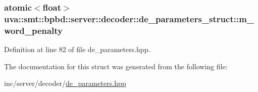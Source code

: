 \subsubsection[{m\+\_\+word\+\_\+penalty}]{\setlength{\rightskip}{0pt plus 5cm}atomic$<$float$>$ uva\+::smt\+::bpbd\+::server\+::decoder\+::de\+\_\+parameters\+\_\+struct\+::m\+\_\+word\+\_\+penalty}\label{structuva_1_1smt_1_1bpbd_1_1server_1_1decoder_1_1de__parameters__struct_a64e98803ca81cbf1ce6ea815f7efa6a0}


Definition at line 82 of file de\+\_\+parameters.\+hpp.



The documentation for this struct was generated from the following file\+:\begin{DoxyCompactItemize}
\item 
inc/server/decoder/\hyperlink{de__parameters_8hpp}{de\+\_\+parameters.\+hpp}\end{DoxyCompactItemize}
